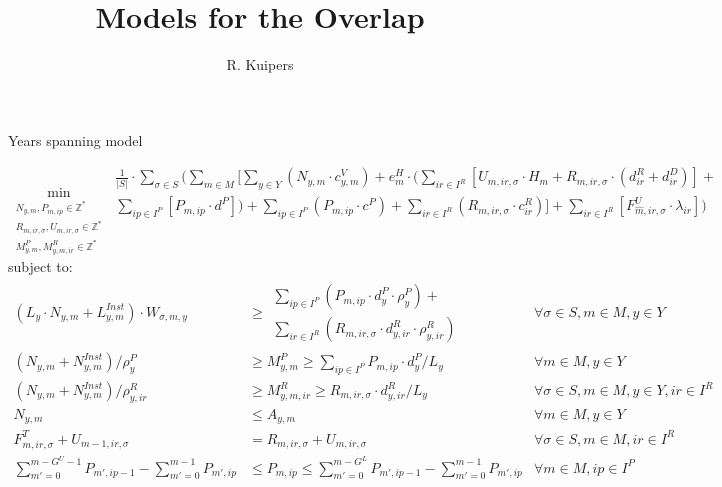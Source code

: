 \documentclass{beamer}
\title[Models for the Overlap]{Models for the Overlap}
\author{R. Kuipers}
\newcommand{\smalld}{\tiny}
\begin{document}
\begin{frame}{Years spanning model}
\smalld

\begin{equation}
	\min_{\substack{N_{y,m}, P_{m,ip} \in \mathbb{Z}^* \\ 
	R_{m,ir,\sigma}, U_{m,ir,\sigma} \in \mathbb{Z}^*  \\
	M^P_{y, m}, M^R_{y, m, ir} \in \mathbb{Z}^*}}
	\begin{aligned}
	\frac{1}{|S|} \cdot \sum_{\sigma \in S} ( \sum_{m \in M} [ 
	\sum_{y \in Y} (N_{y,m} \cdot c^V_{y,m}) +  
	e^H_m \cdot (\sum_{ir \in I^R}[U_{m,ir,\sigma} \cdot H_m + 
	R_{m,ir,\sigma} \cdot (d^R_{ir} + d^D_{ir})] +\\
	\sum_{ip \in I^P} [P_{m,ip} \cdot d^P]) + 
	\sum_{ip \in I^P} (P_{m,ip} \cdot c^P) + \sum_{ir \in I^R} (R_{m,ir,\sigma} \cdot c^R_{ir})] + 
	\sum_{ir \in I^R} [F^U_{\hat{m}, ir, \sigma} \cdot \lambda_{ir}] )
	\end{aligned}	
\end{equation}
subject to:
\begin{align}
(L_y \cdot N_{y,m} + L^{Inst}_{y,m}) \cdot W_{\sigma, m, y}	&\geq		\begin{aligned}\sum_{ip \in I^P} (P_{m,ip} \cdot d^P_y \cdot \rho^P_y) +\\ 
									\sum_{ir\in I^R} (R_{m,ir,\sigma} \cdot d^R_{y, ir} \cdot \rho^R_{y, ir})\end{aligned}																												& \forall \sigma \in S, m \in M, y \in Y	\\
(N_{y,m} + N^{Inst}_{y,m}) / \rho^P_y	 &\geq	M^P_{y, m}	\geq 	\sum_{ip \in I^P} P_{m,ip} \cdot d^P_y / L_y																																& \forall m \in M, y \in Y 	\\
(N_{y,m} + N^{Inst}_{y,m}) / \rho^R_{y, ir} &\geq M^R_{y, m, ir}\geq 	R_{m,ir,\sigma} \cdot d^R_{y, ir} / L_y 																												& \forall \sigma \in S, m \in M, y \in Y, ir \in I^R \\
N_{y,m}						&\leq 		A_{y,m} 										& \forall m \in M, y \in Y 	\\
F^T_{m, ir, \sigma} + U_{m-1,ir,\sigma} 	&=		R_{m,ir,\sigma} + U_{m,ir,\sigma}						& \forall \sigma \in S, m \in M, ir \in I^R	\\
\sum_{m' = 0}^{m-G^U-1} P_{m',ip-1} - \sum_{m' = 0}^{m-1} P_{m',ip} 	&\leq P_{m,ip}	\leq 	\sum_{m' =  0}^{m-G^L} P_{m',ip-1} - \sum_{m' = 0}^{m-1} P_{m',ip}	
																				& \forall m \in M, ip \in I^P			
\end{align}

\end{frame}
\end{document}
